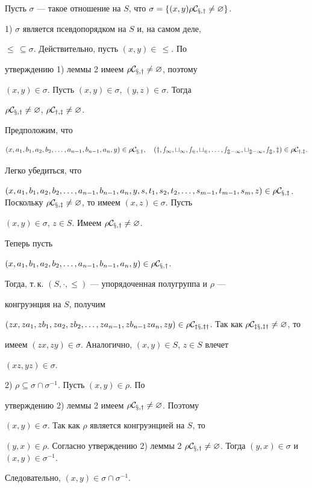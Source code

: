\begin{pf} 


Пусть $\sigma$ --- такое отношение на $S$, что $\sigma=\{(x,y)\rho\cal 


C_{x,y}\ne\varnothing\}$. 


 


1) $\sigma$ является псевдопорядком на $S$ и, на самом деле, 


$\le\,\subseteq\sigma$. Действительно, пусть $(x,y)\in\,\le$. По 


утверждению 1) леммы 2 имеем $\rho\cal C_{x,y}\ne\varnothing$, поэтому 


$(x,y)\in\sigma$. Пусть $(x,y)\in\sigma$, $(y,z)\in\sigma$. Тогда 


$\rho\cal C_{x,y}\ne\varnothing$, $\rho\cal C_{y,z}\ne\varnothing$. 


Предположим, что 


$$ 


(x,a_1,b_1,a_2,b_2,\dotsc,a_{n-1},b_{n-1},a_n,y)\in\rho\cal C_{x,y}, 


\quad 


(y,s_1,t_1,s_2,t_2,\dotsc,s_{m-1},t_{m-1},s_m,z)\in\rho\cal C_{y,z}. 


$$ 


Легко убедиться, что 


$(x,a_1,b_1,a_2,b_2,\dotsc,a_{n-1},b_{n-1},a_n,y,s,t_1,s_2,t_2 


,\dotsc,s_{m-1},t_{m-1},s_m,z)\in\rho\cal C_{x,z}$. Поскольку $\rho\cal 


C_{x,z}\ne\varnothing$, то имеем $(x,z)\in\sigma$. Пусть 


$(x,y)\in\sigma$, $z\in S$. Имеем $\rho\cal C_{x,y}\ne\varnothing$. 


Теперь пусть 


$(x,a_1,b_1,a_2,b_2,\dotsc,a_{n-1},b_{n-1},a_n,y)\in\rho\cal C_{x,y}$. 


Тогда, т.\,к. $(S,\cdot,\le)$ --- упорядоченная полугруппа и $\rho$ --- 


конгруэнция на $S$, получим 


$(zx,za_1,zb_1,za_2,zb_2,\dotsc,za_{n-1},zb_{n-1}za_n,zy) 


\in\rho\cal C_{zx,zy}$. Так как $\rho\cal C_{zx,zy}\ne\varnothing$, то 


имеем $(zx,zy)\in\sigma$. Аналогично, $(x,y)\in S$, $z\in S$ влечет 


$(xz,yz)\in\sigma$. 


 


2) $\rho\subseteq\sigma\cap\sigma^{-1}$. Пусть $(x,y)\in\rho$. По 


утверждению 2) леммы 2 имеем $\rho\cal C_{x,y}\ne\varnothing$. Поэтому 


$(x,y)\in\sigma$. Так как $\rho$ является конгруэнцией на $S$, то 


$(y,x)\in\rho$. Согласно утверждению 2) леммы 2\; $\rho\cal 


C_{x,y}\ne\varnothing$. Тогда $(y,x)\in\sigma$ и $(x,y)\in\sigma^{-1}$. 


Следовательно, $(x,y)\in\sigma\cap\sigma^{-1}$. 


\end{pf} 
